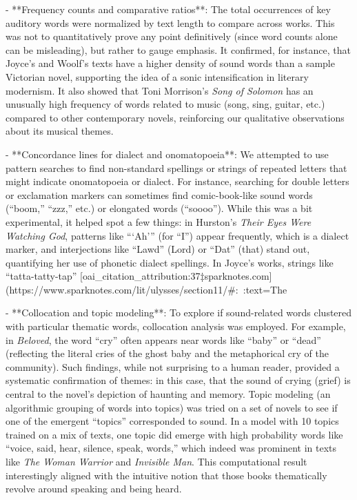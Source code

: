 \documentclass[12pt]{report}
\begin{document}
- **Frequency counts and comparative ratios**: The total occurrences of key auditory words were normalized by text length to compare across works. This was not to quantitatively prove any point definitively (since word counts alone can be misleading), but rather to gauge emphasis. It confirmed, for instance, that Joyce’s and Woolf’s texts have a higher density of sound words than a sample Victorian novel, supporting the idea of a sonic intensification in literary modernism. It also showed that Toni Morrison’s \textit{Song of Solomon} has an unusually high frequency of words related to music (song, sing, guitar, etc.) compared to other contemporary novels, reinforcing our qualitative observations about its musical themes.

- **Concordance lines for dialect and onomatopoeia**: We attempted to use pattern searches to find non-standard spellings or strings of repeated letters that might indicate onomatopoeia or dialect. For instance, searching for double letters or exclamation markers can sometimes find comic-book-like sound words (“boom,” “zzz,” etc.) or elongated words (“soooo”). While this was a bit experimental, it helped spot a few things: in Hurston’s \textit{Their Eyes Were Watching God}, patterns like “‘Ah’” (for “I”) appear frequently, which is a dialect marker, and interjections like “Lawd” (Lord) or “Dat” (that) stand out, quantifying her use of phonetic dialect spellings. In Joyce’s works, strings like “tatta-tatty-tap” [oai_citation_attribution:37‡sparknotes.com](https://www.sparknotes.com/lit/ulysses/section11/#:~:text=The%

- **Collocation and topic modeling**: To explore if sound-related words clustered with particular thematic words, collocation analysis was employed. For example, in \textit{Beloved}, the word “cry” often appears near words like “baby” or “dead” (reflecting the literal cries of the ghost baby and the metaphorical cry of the community). Such findings, while not surprising to a human reader, provided a systematic confirmation of themes: in this case, that the sound of crying (grief) is central to the novel’s depiction of haunting and memory. Topic modeling (an algorithmic grouping of words into topics) was tried on a set of novels to see if one of the emergent “topics” corresponded to sound. In a model with 10 topics trained on a mix of texts, one topic did emerge with high probability words like “voice, said, hear, silence, speak, words,” which indeed was prominent in texts like \textit{The Woman Warrior} and \textit{Invisible Man}. This computational result interestingly aligned with the intuitive notion that those books thematically revolve around speaking and being heard.
\end{document}
